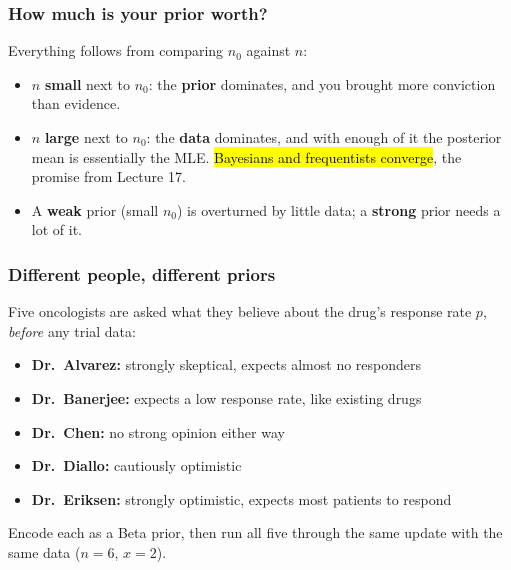 \documentclass[slidestop,compress,mathserif]{beamer}
\begin{document}
\begin{frame}
\frametitle{How much is your prior worth?}

Everything follows from comparing $n_0$ against $n$:

\pause
\medskip
\begin{itemize}
\item $n$ \textbf{small} next to $n_0$: the \textbf{prior} dominates, and you brought more conviction than evidence.
\pause
\medskip
\item $n$ \textbf{large} next to $n_0$: the \textbf{data} dominates, and with enough of it the posterior mean is essentially the MLE. \hl{Bayesians and frequentists converge}, the promise from Lecture 17.
\pause
\medskip
\item A \textbf{weak} prior (small $n_0$) is overturned by little data; a \textbf{strong} prior needs a lot of it.
\end{itemize}

\end{frame}

\begin{frame}
\frametitle{Different people, different priors}

Five oncologists are asked what they believe about the drug's response rate $p$, \emph{before} any trial data:

\pause
\medskip

\begin{itemize}
\item \textbf{Dr.\ Alvarez:} strongly skeptical, expects almost no responders
\item \textbf{Dr.\ Banerjee:} expects a low response rate, like existing drugs
\item \textbf{Dr.\ Chen:} no strong opinion either way
\item \textbf{Dr.\ Diallo:} cautiously optimistic
\item \textbf{Dr.\ Eriksen:} strongly optimistic, expects most patients to respond
\end{itemize}

\pause
\medskip

Encode each as a Beta prior, then run all five through the same update with the same data ($n=6$, $x=2$).

\end{frame}
\end{document}
